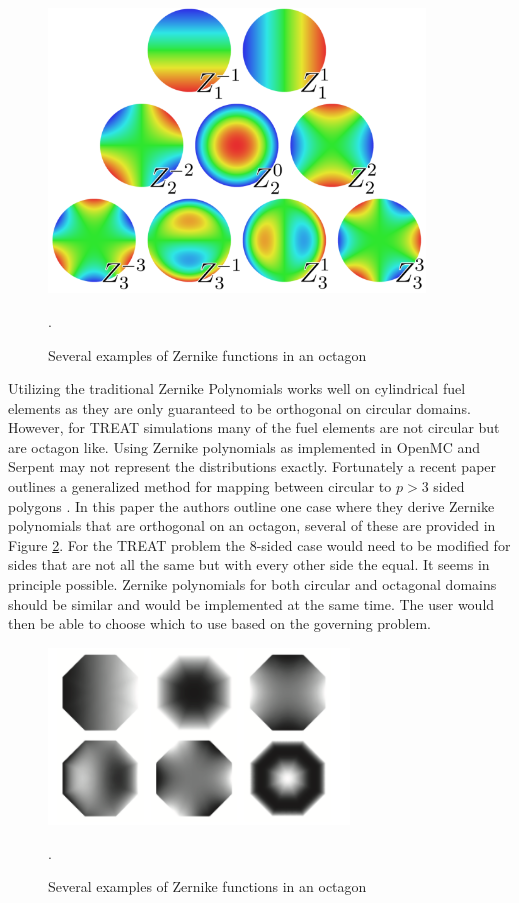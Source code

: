 \documentclass[11pt]{article}
\begin{document}
\begin{figure}
    \centering
    \includegraphics[width=10cm]{figures/zernike-circle.png}
    \caption{Several examples of Zernike functions in an octagon \cite{ferreira2015orthogonal}}.
    \label{fig:zernike}
\end{figure}

Utilizing the traditional Zernike Polynomials works well on cylindrical fuel elements as they are only guaranteed to be orthogonal on circular domains.  However, for  TREAT simulations many of the fuel elements are not circular but are octagon like.  Using Zernike polynomials as implemented in OpenMC and Serpent may not represent the distributions exactly.  Fortunately a recent paper outlines a generalized method for mapping between circular to $p >3$ sided polygons \cite{ferreira2015orthogonal}.  In this paper the authors outline one case where they derive Zernike polynomials that are orthogonal on an octagon, several of these are provided in Figure \ref{fig:oct-fet}. For the TREAT problem the 8-sided case would need to be modified for sides that are not all the same but with every other side the equal.  It seems in principle possible.  Zernike polynomials for both circular and octagonal domains should be similar and would be implemented at the same time.  The user would then be able to choose which to use based on the governing problem.  
\begin{figure}
    \centering
    \includegraphics[width=8cm]{figures/octogon-FET.png}
    \caption{Several examples of Zernike functions in an octagon \cite{ferreira2015orthogonal}}.
    \label{fig:oct-fet}
\end{figure}
 
\end{document}
